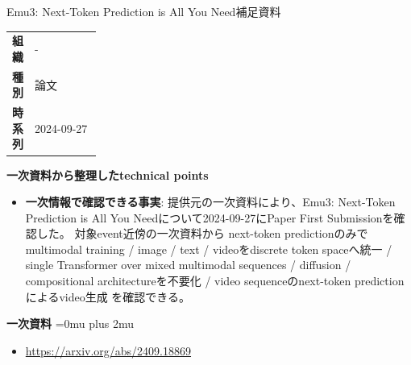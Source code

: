 \begin{technicalnote}{Emu3: Next-Token Prediction is All You Need}{補足資料}
\begingroup
\begin{tabularx}{\linewidth}{@{}>{\bfseries}p{0.22\linewidth}X@{}}
組織 & - \\
種別 & 論文 \\
時系列 & 2024-09-27 \\
\end{tabularx}
\smallskip
{\bfseries 一次資料から整理したtechnical points}
\begin{itemize}[leftmargin=1.5em,itemsep=0.35em]
\item \textbf{一次情報で確認できる事実}: 提供元の一次資料により、Emu3: Next-Token Prediction is All You Needについて2024-09-27にPaper First Submissionを確認した。 対象event近傍の一次資料から next-token predictionのみでmultimodal training / image / text / videoをdiscrete token spaceへ統一 / single Transformer over mixed multimodal sequences / diffusion / compositional architectureを不要化 / video sequenceのnext-token predictionによるvideo生成 を確認できる。
\end{itemize}
\begin{minipage}{\linewidth}
\begin{samepage}
{\bfseries 一次資料}
\begingroup\sloppy
\Urlmuskip=0mu plus 2mu\relax
\begin{itemize}[leftmargin=1.5em,itemsep=0.25em]
\item {\scriptsize\url{https://arxiv.org/abs/2409.18869}}
\end{itemize}
\endgroup
\end{samepage}
\end{minipage}
\endgroup
\end{technicalnote}
\medskip

